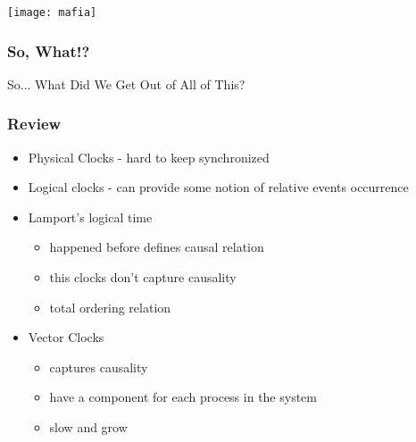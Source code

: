 \documentclass[aspectratio=169, 15pt,usenames,dvipsnames]{beamer}
\begin{document}
{\begin{gdblank}
\begin{columns}
\begin{column}{0.5\textwidth}
		\end{column}	
	\end{columns} 
	\end{gdblank}
	\begin{gdblank}		
		\centering
		\texttt{[image: mafia]}
	\end{gdblank}
	\begin{gdblank}
		\frametitle{So, What!?}
		\centering
		\large 
		So... What Did We Get Out of All of This?
	\end{gdblank}	
	\begin{gdblank}
		\frametitle{Review}
		\begin{itemize}
			\large
			\item Physical Clocks - hard to keep synchronized
			\item Logical clocks - can provide some notion of relative events occurrence
			\item Lamport's logical time
			      \begin{itemize}
			      	\item happened before defines causal relation
			      	\item this clocks don't capture causality
			      	\item total ordering relation
			      \end{itemize}
			\item Vector Clocks
			      \begin{itemize}
			      	\item captures causality
			      	\item have a component for each process in the system
			      	\item slow and grow
			      \end{itemize}
		\end{itemize}
	\end{gdblank} 
}
\end{document}

